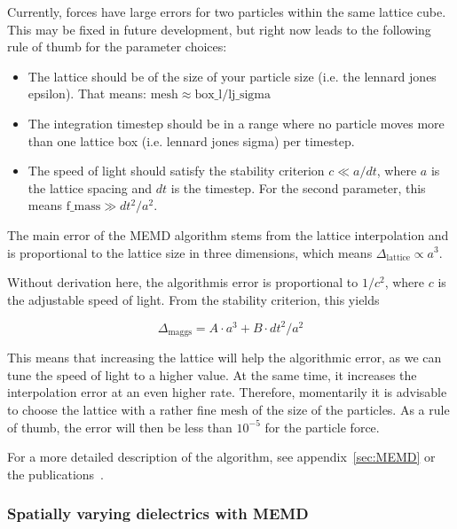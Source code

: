 Currently, forces have large errors for two particles within the same
lattice cube. This may be fixed in future development, but right now
leads to the following rule of thumb for the parameter choices:

\begin{itemize}
  \item The lattice should be of the size of your particle size
    (i.e. the lennard jones epsilon). That means: $\text{mesh} \approx
    \text{box\_l} / \text{lj\_sigma}$
  \item The integration timestep should be in a range where no
    particle moves more than one lattice box (i.e. lennard jones
    sigma) per timestep.
  \item The speed of light should satisfy the stability criterion
    $c\ll a/dt$, where $a$ is the lattice spacing and $dt$ is the
    timestep. For the second parameter, this means $\text{f\_mass} \gg
    dt^2/a^2$.
\end{itemize}

The main error of the MEMD algorithm stems from the lattice
interpolation and is proportional to the lattice size in three
dimensions, which means $\Delta_\text{lattice} \propto a^3$.

Without derivation here, the algorithmis error is proportional to
$1/c^2$, where $c$ is the adjustable speed of light. From the
stability criterion, this yields

\begin{equation}
\Delta_\text{maggs} = A\cdot a^3 + B\cdot dt^2/a^2
\end{equation}

This means that increasing the lattice will help the algorithmic
error, as we can tune the speed of light to a higher value. At the
same time, it increases the interpolation error at an even higher
rate. Therefore, momentarily it is advisable to choose the lattice
with a rather fine mesh of the size of the particles. As a rule of
thumb, the error will then be less than $10^{-5}$ for the particle
force.

For a more detailed description of the algorithm, see
appendix~\vref{sec:MEMD} or the publications~\cite{maggs02a,
  pasichnyk04a}.

\subsubsection{Spatially varying dielectrics with MEMD}
\label{sec:dielectric-memd}

